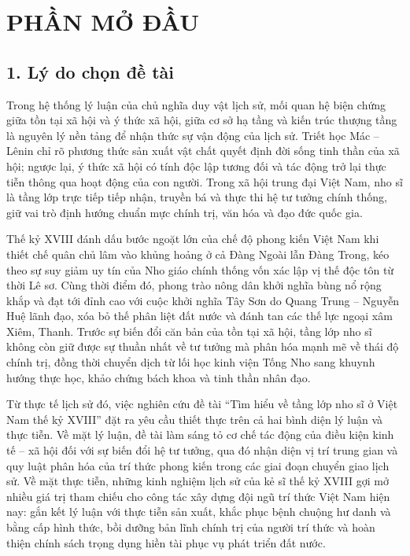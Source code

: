 \section*{PHẦN MỞ ĐẦU}

\subsection*{1. Lý do chọn đề tài}

Trong hệ thống lý luận của chủ nghĩa duy vật lịch sử, mối quan hệ biện chứng giữa tồn tại xã hội và ý thức xã hội, giữa cơ sở hạ tầng và kiến trúc thượng tầng là nguyên lý nền tảng để nhận thức sự vận động của lịch sử. Triết học Mác -- Lênin chỉ rõ phương thức sản xuất vật chất quyết định đời sống tinh thần của xã hội; ngược lại, ý thức xã hội có tính độc lập tương đối và tác động trở lại thực tiễn thông qua hoạt động của con người. Trong xã hội trung đại Việt Nam, nho sĩ là tầng lớp trực tiếp tiếp nhận, truyền bá và thực thi hệ tư tưởng chính thống, giữ vai trò định hướng chuẩn mực chính trị, văn hóa và đạo đức quốc gia.

Thế kỷ XVIII đánh dấu bước ngoặt lớn của chế độ phong kiến Việt Nam khi thiết chế quân chủ lâm vào khủng hoảng ở cả Đàng Ngoài lẫn Đàng Trong, kéo theo sự suy giảm uy tín của Nho giáo chính thống vốn xác lập vị thế độc tôn từ thời Lê sơ. Cùng thời điểm đó, phong trào nông dân khởi nghĩa bùng nổ rộng khắp và đạt tới đỉnh cao với cuộc khởi nghĩa Tây Sơn do Quang Trung -- Nguyễn Huệ lãnh đạo, xóa bỏ thế phân liệt đất nước và đánh tan các thế lực ngoại xâm Xiêm, Thanh. Trước sự biến đổi căn bản của tồn tại xã hội, tầng lớp nho sĩ không còn giữ được sự thuần nhất về tư tưởng mà phân hóa mạnh mẽ về thái độ chính trị, đồng thời chuyển dịch từ lối học kinh viện Tống Nho sang khuynh hướng thực học, khảo chứng bách khoa và tinh thần nhân đạo.

Từ thực tế lịch sử đó, việc nghiên cứu đề tài ``Tìm hiểu về tầng lớp nho sĩ ở Việt Nam thế kỷ XVIII'' đặt ra yêu cầu thiết thực trên cả hai bình diện lý luận và thực tiễn. Về mặt lý luận, đề tài làm sáng tỏ cơ chế tác động của điều kiện kinh tế -- xã hội đối với sự biến đổi hệ tư tưởng, qua đó nhận diện vị trí trung gian và quy luật phân hóa của trí thức phong kiến trong các giai đoạn chuyển giao lịch sử. Về mặt thực tiễn, những kinh nghiệm lịch sử của kẻ sĩ thế kỷ XVIII gợi mở nhiều giá trị tham chiếu cho công tác xây dựng đội ngũ trí thức Việt Nam hiện nay: gắn kết lý luận với thực tiễn sản xuất, khắc phục bệnh chuộng hư danh và bằng cấp hình thức, bồi dưỡng bản lĩnh chính trị của người trí thức và hoàn thiện chính sách trọng dụng hiền tài phục vụ phát triển đất nước.

